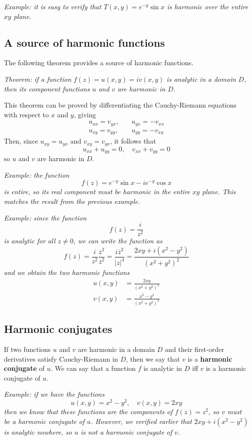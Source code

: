 \documentclass{article}
\renewcommand{\emph}{\textbf}
\renewcommand{\bar}{\overline}
\begin{document}
\textit{Example: it is easy to verify that $T(x, y) = e^{-y} \sin x$ is harmonic over the entire $xy$ plane.}

\subsection{A source of harmonic functions}
The following theorem provides a source of harmonic functions.

\textit{Theorem: if a function $f(z) = u(x, y) = iv(x, y)$ is analytic in a domain $D$, then its component functions $u$ and $v$ are harmonic in $D$.}

This theorem can be proved by differentiating the Cauchy-Riemann equations with respect to $x$ and $y$, giving
\begin{align*}
	u_{xx} = v_{yx},	&\quad	u_{yx} = -v_{xx}	\\
	u_{xy} = v_{yy},	&\quad	u_{yy} = -v_{xy}
\end{align*}
Then, since $u_{xy} = u_{yx}$ and $v_{xy} = v_{yx}$, it follows that
\[
	u_{xx} + u_{yy} = 0,	\quad	v_{xx} + v_{yy} = 0
\]
so $u$ and $v$ are harmonic in $D$.

\textit{Example: the function
\[
	f(z) = e^{-y} \sin x - ie^{-y} \cos x
\]
is entire, so its real component must be harmonic in the entire $xy$ plane. This matches the result from the previous example.}

\textit{Example: since the function
\[
	f(z) = \frac{i}{z^2}
\]
is analytic for all $z \neq 0$, we can write the function as
\[
	f(z) = \frac{i}{z^2} \frac{\bar{z}^2}{\bar{z}^2} = \frac{i\bar{z}^2}{|z|^4}
	= \frac{2xy + i(x^2 - y^2)}{(x^2 + y^2)^2}
\]
and we obtain the two harmonic functions
\begin{align*}
	u(x, y) &= \frac{2xy}{(x^2 + y^2)^2} \\
	v(x, y) &= \frac{x^2 - y^2}{(x^2 + y^2)^2}
\end{align*}}

\subsection{Harmonic conjugates}
If two functions $u$ and $v$ are harmonic in a domain $D$ and their first-order derivatives satisfy Cauchy-Riemann in $D$, then we say that $v$ is a \emph{harmonic conjugate} of $u$. We can say that a function $f$ is analytic in $D$ iff $v$ is a harmonic conjugate of $u$. 

\textit{Example: if we have the functions
\[
	u(x, y) = x^2 - y^2, 	\quad v(x, y) = 2xy
\]
then we know that these functions are the components of $f(z) = z^2$, so $v$ must be a harmonic conjugate of $u$. However, we verified earlier that $2xy + i(x^2 - y^2)$ is analytic nowhere, so $u$ is not a harmonic conjugate of $v$.}
\end{document}
